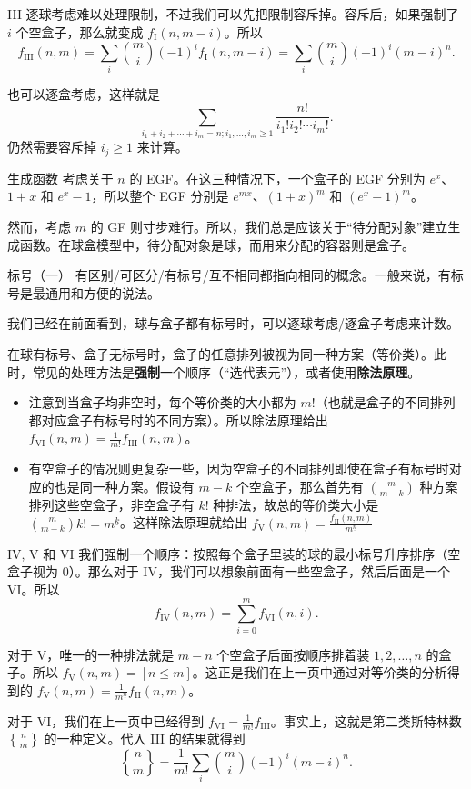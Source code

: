 \begin{frame}{III}
    逐球考虑难以处理限制，不过我们可以先把限制容斥掉。容斥后，如果强制了 $i$ 个空盒子，那么就变成 $f_{\mathrm{I}}(n,m-i)$。所以
    $$
    f_{\mathrm{III}}(n,m)=\sum_i\binom{m}{i}(-1)^i f_{\mathrm{I}}(n,m-i)=\sum_{i}\binom{m}{i}(-1)^i (m-i)^n.
    $$

    也可以逐盒考虑，这样就是
    $$
    \sum_{i_1+i_2+\cdots+i_m=n;i_1,\ldots,i_m\ge 1}\frac{n!}{i_1!i_2!\cdots i_m!}.
    $$
    仍然需要容斥掉 $i_j\ge 1$ 来计算。
\end{frame}
\begin{frame}{生成函数}
    考虑关于 $n$ 的 EGF。在这三种情况下，一个盒子的 EGF 分别为 $e^x$、$1+x$ 和 $e^x-1$，所以整个 EGF 分别是 $e^{mx}$、$(1+x)^m$ 和 $(e^x-1)^m$。

    然而，考虑 $m$ 的 GF 则寸步难行。所以，我们总是应该关于“待分配对象”建立生成函数。在球盒模型中，待分配对象是球，而用来分配的容器则是盒子。
\end{frame}
\begin{frame}{标号（一）}
    有区别/可区分/有标号/互不相同都指向相同的概念。一般来说，有标号是最通用和方便的说法。

    我们已经在前面看到，球与盒子都有标号时，可以逐球考虑/逐盒子考虑来计数。

    在球有标号、盒子无标号时，盒子的任意排列被视为同一种方案（等价类）。此时，常见的处理方法是\textbf{强制}一个顺序（“选代表元”），或者使用\textbf{除法原理}。
        \begin{itemize}
            \item 注意到当盒子均非空时，每个等价类的大小都为 $m!$（也就是盒子的不同排列都对应盒子有标号时的不同方案）。所以除法原理给出 $f_{\mathrm{VI}}(n,m)=\frac{1}{m!}f_{\mathrm{III}}(n,m)$。
            \item 有空盒子的情况则更复杂一些，因为空盒子的不同排列即使在盒子有标号时对应的也是同一种方案。假设有 $m-k$ 个空盒子，那么首先有 $\binom{m}{m-k}$ 种方案排列这些空盒子，非空盒子有 $k!$ 种排法，故总的等价类大小是 $\binom{m}{m-k} k!=m^{\underline{k}}$。这样除法原理就给出 $f_{\mathrm{V}}(n,m)=\frac{f_{\mathrm{II}}(n,m)}{m^{\underline{n}}}$
        \end{itemize}
\end{frame}
\begin{frame}{IV, V 和 VI}
    我们强制一个顺序：按照每个盒子里装的球的最小标号升序排序（空盒子视为 $0$）。那么对于 IV，我们可以想象前面有一些空盒子，然后后面是一个 VI。所以
    $$
    f_{\mathrm{IV}}(n,m)=\sum_{i=0}^m f_{\mathrm{VI}}(n,i).
    $$

    对于 V，唯一的一种排法就是 $m-n$ 个空盒子后面按顺序排着装 $1,2,\ldots,n$ 的盒子。所以 $f_{\mathrm{V}}(n,m)=[n\le m]$。这正是我们在上一页中通过对等价类的分析得到的 $f_{\mathrm{V}}(n,m)=\frac{1}{m^{\underline{n}}}f_{\mathrm{II}}(n,m)$。

    对于 VI，我们在上一页中已经得到 $f_{\mathrm{VI}}=\frac{1}{m!}f_{\mathrm{III}}$。事实上，这就是第二类斯特林数 $n\brace m$ 的一种定义。代入 III 的结果就得到
    $$
    {n\brace m}=\frac{1}{m!}\sum_i\binom{m}{i}(-1)^i(m-i)^n.
    $$
\end{frame}
